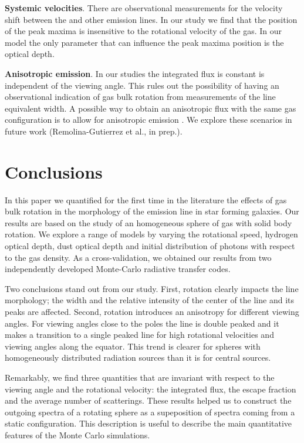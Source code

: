 \documentclass{emulateapj}
\newcommand{\ly}{{\ifmmode{{\rm Ly}\alpha~}\else{Ly$\alpha$~}\fi}}
\begin{document}
{\bf Systemic velocities}. There are observational measurements for the
velocity shift between the \ly and other emission lines. In our study
we find that the position of the peak maxima is insensitive to the
rotational velocity of the gas. In our model the only parameter that
can influence the peak maxima position is the optical depth.

{\bf Anisotropic emission}. In our studies the integrated flux is
constant is independent of the viewing angle. This rules out the
possibility of having an observational indication of gas bulk rotation
from measurements of the line equivalent width. A possible way to
obtain an anisotropic flux with the same gas configuration is to allow
for anisotropic emission \citep{Zheng2013,Behrens2014}. We explore
these scenarios in future work (Remolina-Gutierrez et al., in prep.).



\section{Conclusions}
\label{sec:conclusions}

In this paper we quantified for the first time in the literature the effects
of gas bulk rotation in the morphology of the \ly emission line in
star forming galaxies.   
Our results are based on the study of an homogeneous sphere
of gas with solid body rotation. 
We explore a range of models by varying the rotational speed, hydrogen
optical depth, dust optical depth and initial distribution of \ly
photons with respect to the gas density. 
As a cross-validation, we obtained our results from two independently
developed Monte-Carlo radiative transfer codes.  

Two conclusions stand out from our study. 
First, rotation clearly impacts the \ly line morphology; the width and
the relative intensity of the center of the line and its peaks are
affected. 
Second, rotation introduces an anisotropy for different viewing
angles. 
For viewing angles close to the poles the line is double peaked and it
makes a transition to a single peaked line for high rotational
velocities and viewing angles along the equator. 
This trend is clearer for spheres with homogeneously distributed
radiation sources than it is for central sources.

Remarkably, we find three quantities that are invariant with respect
to the viewing angle and the rotational velocity: the integrated flux,
the escape fraction and the average number of scatterings.
These results helped us to construct the outgoing spectra of a
rotating sphere as a supeposition of spectra coming from a static
configuration. This description is useful to describe the main
quantitative features of the Monte Carlo simulations. 
\end{document}
